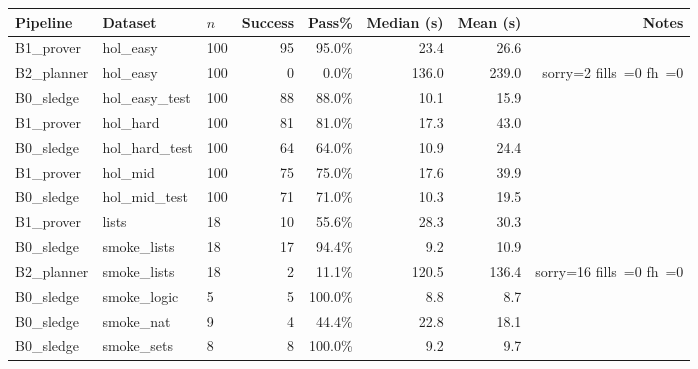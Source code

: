 \begin{tabular}{lllrrrrr}
\toprule
Pipeline & Dataset & $n$ & Success & Pass\% & Median (s) & Mean (s) & Notes \\
\midrule
B1_prover & hol\_easy & 100 & 95 & 95.0\% & 23.4 & 26.6 &  \\
B2_planner & hol\_easy & 100 & 0 & 0.0\% & 136.0 & 239.0 & sorry=2 fills~=0 fh~=0 \\
B0_sledge & hol\_easy\_test & 100 & 88 & 88.0\% & 10.1 & 15.9 &  \\
B1_prover & hol\_hard & 100 & 81 & 81.0\% & 17.3 & 43.0 &  \\
B0_sledge & hol\_hard\_test & 100 & 64 & 64.0\% & 10.9 & 24.4 &  \\
B1_prover & hol\_mid & 100 & 75 & 75.0\% & 17.6 & 39.9 &  \\
B0_sledge & hol\_mid\_test & 100 & 71 & 71.0\% & 10.3 & 19.5 &  \\
B1_prover & lists & 18 & 10 & 55.6\% & 28.3 & 30.3 &  \\
B0_sledge & smoke\_lists & 18 & 17 & 94.4\% & 9.2 & 10.9 &  \\
B2_planner & smoke\_lists & 18 & 2 & 11.1\% & 120.5 & 136.4 & sorry=16 fills~=0 fh~=0 \\
B0_sledge & smoke\_logic & 5 & 5 & 100.0\% & 8.8 & 8.7 &  \\
B0_sledge & smoke\_nat & 9 & 4 & 44.4\% & 22.8 & 18.1 &  \\
B0_sledge & smoke\_sets & 8 & 8 & 100.0\% & 9.2 & 9.7 &  \\
\bottomrule
\end{tabular}